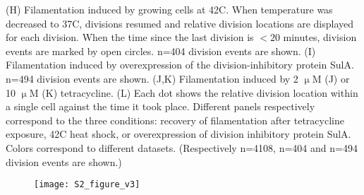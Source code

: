 {  (H) Filamentation induced by growing cells at 42C. When temperature was decreased to 37C, divisions resumed and relative division locations are displayed for each division. When the time since the last division is $<20$ minutes, division events are marked by open circles. n=404 division events are shown. 
  (I) Filamentation induced by overexpression of the division-inhibitory protein SulA. n=494 division events are shown.
  (J,K) Filamentation induced by 2 $\upmu$M (J) or 10 $\upmu$M 
  (K) tetracycline. 
  (L) Each dot shows the relative division location within a single cell against the time it took place. Different panels respectively correspond to the three conditions: recovery of filamentation after tetracycline exposure, 42C heat shock, or overexpression of division inhibitory protein SulA.
  Colors correspond to different datasets. 
  (Respectively n=4108, n=404 and n=494 division events are shown.) 
}

\begin{figure}
	\centering
	\texttt{[image: S2\_figure\_v3]}
\end{figure}	

\clearpage

